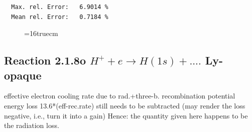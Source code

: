 \documentclass[12pt,dvips]{article}
\begin{document}
\begin{small}
\begin{verbatim}
  Max. rel. Error:   6.9014 %
  Mean rel. Error:   0.7184 %

\end{verbatim}\end{small}
\begin{figure} \label{2.1.8r4}
\epsfxsize=16truecm
\end{figure}
\newpage

\subsection{
  Reaction 2.1.8o $H^+ + e \rightarrow H(1s) + ....$ Ly-opaque
}

   effective electron cooling rate due to rad.+three-b. recombination
   potential energy loss 13.6*(eff-rec.rate) still needs to be
   subtracted (may render the loss negative, i.e., turn it into a gain)
   Hence: the quantity given here happens to be the radiation loss.
\end{document}
